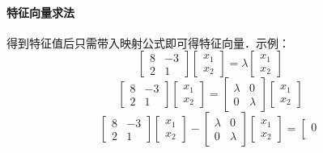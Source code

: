 \documentclass[12pt]{article}
\begin{document}
\begin{CJK}{UTF8}{gbsn}
\paragraph{特征向量求法}
得到特征值后只需带入映射公式即可得特征向量．示例：
\begin{equation}
\left[
\begin{array}{cc}
8 & -3\\
2 & 1
\end{array}
\right]
\left[
\begin{array}{c}
x_1\\
x_2
\end{array}
\right]=\lambda
\left[
\begin{array}{c}
x_1\\
x_2
\end{array}
\right]
\end{equation}
\begin{equation}
\left[
\begin{array}{cc}
8 & -3\\
2 & 1
\end{array}
\right]
\left[
\begin{array}{c}
x_1\\
x_2
\end{array}
\right]=
\left[
\begin{array}{cc}
\lambda & 0\\
0 & \lambda
\end{array}
\right]
\left[
\begin{array}{c}
x_1\\
x_2
\end{array}
\right]
\end{equation}
\begin{equation}
\left[
\begin{array}{cc}
8 & -3\\
2 & 1
\end{array}
\right]
\left[
\begin{array}{c}
x_1\\
x_2
\end{array}
\right]-
\left[
\begin{array}{cc}
\lambda & 0\\
0 & \lambda
\end{array}
\right]
\left[
\begin{array}{c}
x_1\\
x_2
\end{array}
\right]=\left[
\begin{array}{c}
0\\

\end{array}
\end{equation}
\end{CJK}
\end{document}
